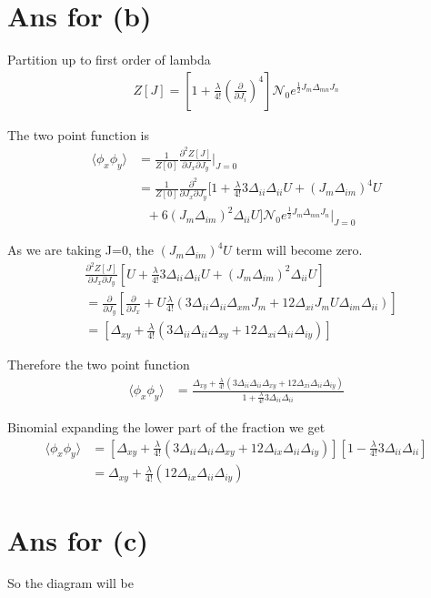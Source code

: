 \documentclass[12pt, letterpaper]{article}
\newcommand*{\1}{\hspace{1pt}}
\begin{document}
    \section*{Ans for (b)}

    Partition up to first order of lambda 
    \begin{align}
        Z[J] = [1 + \frac{\lambda}{4!}(\frac{\partial}{\partial J_{i}})^{4}]\mathcal{N}_{0} e^{\frac{1}{2} J_{m} \Delta _{mn} J_{n}}
    \end{align}


    The two point function is
    \begin{align*}
        \langle \phi_{x}\phi_{y} \rangle & = \frac{1}{Z[0]}\frac{\partial ^2 Z[J]}{\partial J_{x} \partial J_{y}}\Biggr|_{J=0} \\
        & =  \frac{1}{Z[0]}\frac{\partial ^2 }{\partial J_{x} \partial J_{y}}  [1+\frac{\lambda}{4!}3\Delta_{ii}\Delta_{ii}U + (J_{m}\Delta_{im})^{4} U \\
        & \ \ \  + 6(J_{m}\Delta_{im})^{2}\Delta_{ii} U]\mathcal{N}_{0} e^{\frac{1}{2} J_{m} \Delta _{mn} J_{n}}\Biggr|_{J=0}
    \end{align*}

    As we are taking J=0, the  $(J_{m}\Delta_{im})^{4} U$ term will become zero.
    \begin{align*}
         &\frac{\partial ^2 Z[J]}{\partial J_{x} \partial J_{y}}  [U+\frac{\lambda}{4!}3\Delta_{ii}\Delta_{ii}U + (J_{m}\Delta_{im})^{2}\Delta_{ii} U] \\
         & = \frac{\partial }{\partial J_{y}}[\frac{\partial}{\partial J_{x}} + U \frac{\lambda}{4!}(3\Delta_{ii}\Delta_{ii}\Delta_{xm}J_{m} + 12\Delta_{xi}J_{m}U\Delta_{im}\Delta_{ii})] \\ 
         & = [\Delta_{xy} + \frac{\lambda}{4!}(3\Delta_{ii}\Delta_{ii}\Delta_{xy} + 12\Delta_{xi}\Delta_{ii}\Delta_{iy})]
    \end{align*}

    Therefore the two point function
    \begin{align}
        \langle \phi_{x}\phi_{y} \rangle & = \frac{\Delta_{xy} + \frac{\lambda}{4!}(3\Delta_{ii}\Delta_{ii}\Delta_{xy} + 12\Delta_{xi}\Delta_{ii}\Delta_{iy})}{1+\frac{\lambda}{4!} 3\Delta_{ii}\Delta_{ii}}
    \end{align}

    Binomial expanding the lower part of the fraction we get
     \begin{align}
        \langle \phi_{x}\phi_{y} \rangle & = [\Delta_{xy} + \frac{\lambda}{4!}( 3\Delta_{ii}\Delta_{ii}\Delta_{xy} + 12\Delta_{ix}\Delta_{ii}\Delta_{iy})][1-\frac{\lambda}{4!} 3\Delta_{ii}\Delta_{ii}] \\
        & = \Delta_{xy} + \frac{\lambda}{4!}(12\Delta_{ix}\Delta_{ii}\Delta_{iy})
    \end{align}

    \section*{Ans for (c)}

    So the diagram will be 
    \begin{figure}[h]
    \centering
    \end{figure}
\end{document}

